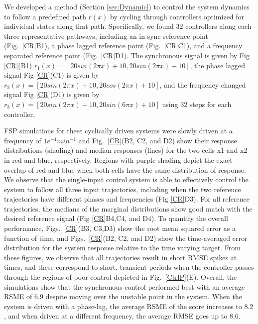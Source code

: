 \documentclass[12pt]{iopart}
\begin{document}
We developed a method (Section \ref{sec:Dynamic}) to control the system dynamics to follow a predefined path $r(x)$ by cycling through controllers optimized for individual states along that path. Specifically, we found 32 controllers along each three representative pathways, including an in-sync reference point (Fig.\ \ref{CR}B1), a phase lagged reference point (Fig.\ \ref{CR}C1),  and a  frequency separated reference point (Fig.\ \ref{CR}D1). The synchronous signal is given by Fig \ref{CR}(B1) $r_1(x)=[20 sin(2 \pi x)+10, 20 sin(2 \pi x)+10]$, the phase lagged signal Fig \ref{CR}(C1) is given by $r_2(x)=[20 sin(2 \pi x)+10, 20 cos(2 \pi x)+10]$, and the frequency changed signal Fig \ref{CR}(D1) is given by $r_3(x)=[20 sin(2 \pi x)+10, 20 sin(6 \pi x)+10]$ using 32 steps for each controller. 

FSP simulations for these cyclically driven systems were slowly driven at a frequency of $1e^{-4} min^{-1}$    and Fig.\ \ref{CR}(B2, C2, and D2) show their response distributions (shading) and median responses (lines) for the two cells x1 and x2 in red and blue, respectively. Regions with purple shading depict the exact overlap of red and blue when both cells have the same distribution of response. We observe that the single-input control system is able to effectively control the system to follow all three input trajectories, including when the two reference trajectories have different phases and frequencies (Fig \ref{CR}D3). 
For all reference trajectories, the medians of the marginal distributions show good match with the desired reference signal (Fig \ref{CR}B4,C4, and D4). To quantify the overall performance, Figs.\ \ref{CR}(B3, C3,D3) show the root mean squared error as a function of time,
and Figs.\ \ref{CR}(B2, C2, and D2) show the time-averaged error distribution for the system response relative to the time varying target. From these figures, we observe that all trajectories result in short RMSE spikes at times, and these correspond to short, transient periods when the controller passes through the regions of poor control depicted in Fig.\ \ref{CtrlP}(E). Overall, the simulations show that the synchronous control performed best with an average RSME of $6.9$ despite moving over the unstable point in the system. When the system is driven with a phase-lag, the average RSME of the score increases to $8.2$, and when driven at a different frequency, the average RMSE goes up to $8.6$.  
\end{document}
